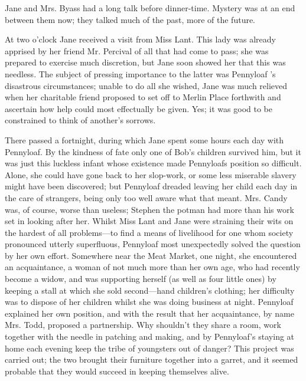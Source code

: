 Jane and Mrs. Byass had a long talk before dinner-time. Mystery was at
an end between them now; they talked much of the past, more of the
future.

At two o'clock Jane received a visit from Miss Lant. This lady was
already apprised by her friend Mr. Percival of all that had come {}to
pass; she was prepared to exercise much discretion, but Jane soon showed
her that this was needless. The subject of pressing importance to the
latter was Pennyloaf 's disastrous circumstances; unable to do all she
wished, Jane was much relieved when her charitable friend proposed to
set off to Merlin Place forthwith and ascertain how help could most
effectually be given. Yes; it was good to be constrained to think of
another's sorrows.

There passed a fortnight, during which Jane spent some hours each day
with Pennyloaf. By the kindness of fate only one of Bob's children
survived him, but it was just this luckless infant whose existence made
Pennyloafs position so difficult. Alone, she could have gone back to her
slop-work, or some less miserable slavery might have been discovered;
but Pennyloaf dreaded leaving her child each day in the care of
strangers, being only too well aware what that meant. Mrs. Candy was, of
course, worse than useless; Stephen the potman had more than his work
set in looking after her. Whilst Miss Lant and Jane were straining their
wits on the hardest of all problems---to find a means of livelihood for
one {}whom society pronounced utterly superfluous, Pennyloaf most
unexpectedly solved the question by her own effort. Somewhere near the
Meat Market, one night, she encountered an acquaintance, a woman of not
much more than her own age, who had recently become a widow, and was
supporting herself (as well as four little ones) by keeping a stall at
which she sold second---hand children's clothing; her difficulty was to
dispose of her children whilst she was doing business at night.
Pennyloaf explained her own position, and with the result that her
acquaintance, by name Mrs. Todd, proposed a partnership. Why shouldn't
they share a room, work together with the needle in patching and making,
and by Pennyloaf's staying at home each evening keep the tribe of
youngsters out of danger? This project was carried out; the two brought
their furniture together into a garret, and it seemed probable that they
would succeed in keeping themselves alive.


